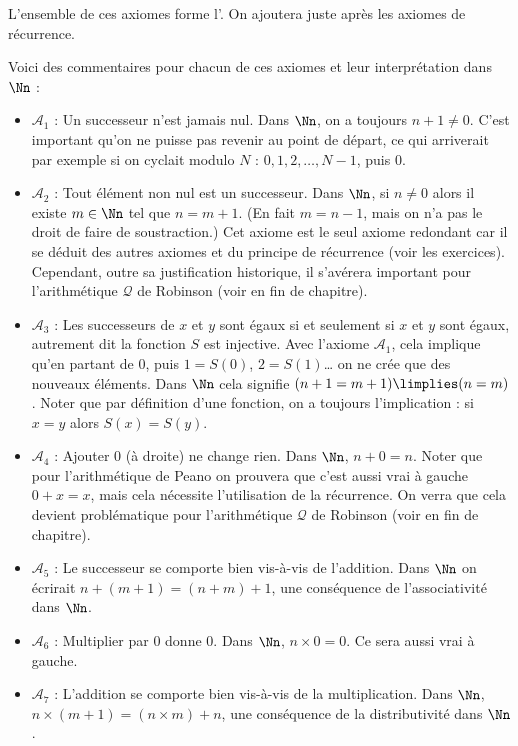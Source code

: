 \documentclass[11pt,class=report,crop=false]{standalone}
\begin{document}
L'ensemble de ces axiomes forme l'. On ajoutera juste après les axiomes de récurrence.

Voici des commentaires pour chacun de ces axiomes et leur interprétation dans $\Nn$ :
\begin{itemize}
	\item $\mathcal{A}_1$ : Un successeur n'est jamais nul. Dans $\Nn$, on a toujours $n+1 \neq 0$. C'est important qu'on ne puisse pas revenir au point de départ, ce qui arriverait par exemple si  on cyclait modulo $N$ : $0, 1, 2, \ldots, N-1$, puis $0$.
	
	\item $\mathcal{A}_2$ : Tout élément non nul est un successeur. Dans $\Nn$, si $n \neq 0$ alors il existe $m \in \Nn$ tel que $n = m+1$. (En fait \og$m = n-1$\fg, mais on n'a pas le droit de faire de soustraction.) Cet axiome est le seul axiome redondant car il se déduit des autres axiomes et du principe de récurrence (voir les exercices). Cependant, outre sa justification historique, il s'avérera important pour l'arithmétique $\mathcal{Q}$ de Robinson (voir en fin de chapitre).
	
	\item $\mathcal{A}_3$ : Les successeurs de $x$ et $y$ sont égaux si et seulement si $x$ et $y$  sont égaux, autrement dit la fonction $S$ est injective. Avec l'axiome $\mathcal{A}_1$, cela implique qu'en partant de $0$, puis $1=S(0)$, $2=S(1)$\ldots{} on ne crée que des nouveaux éléments. Dans $\Nn$ cela signifie $(n+1=m+1) \limplies (n=m)$. Noter que par définition d'une fonction, on a toujours l'implication : si $x=y$ alors $S(x)=S(y)$.
	
	\item $\mathcal{A}_4$ : Ajouter $0$ (à droite) ne change rien. Dans $\Nn$, $n+0=n$. Noter que pour l'arithmétique de Peano on prouvera que c'est aussi vrai à gauche \og$0+x=x$\fg{}, mais cela nécessite l'utilisation de la récurrence. On verra que cela devient problématique pour l'arithmétique $\mathcal{Q}$ de Robinson (voir en fin de chapitre).
	
	\item $\mathcal{A}_5$ : Le successeur se comporte bien vis-à-vis de l'addition. Dans $\Nn$ on écrirait $n+(m+1)=(n+m)+1$, une conséquence de l'associativité dans $\Nn$.
	
	\item $\mathcal{A}_6$ : Multiplier par $0$ donne $0$. Dans $\Nn$, $n \times 0 = 0$. Ce sera aussi vrai à gauche.
	
	\item $\mathcal{A}_7$ : L'addition se comporte bien vis-à-vis de la multiplication. Dans $\Nn$, $n \times (m+1) = (n \times m) + n$, une conséquence de la distributivité dans $\Nn$.
\end{itemize}
\end{document}
